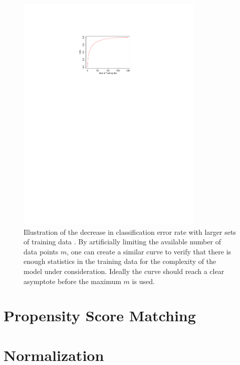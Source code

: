 \begin{figure}
  \centering
  \includegraphics[width=0.8\textwidth]{figures/ml/acc_vs_m}
\caption{
Illustration of the decrease in classification error rate
with larger sets of training data \cite{HastieTF09}.
By artificially limiting the available number of data points $m$,
one can create a similar curve to verify that
there is enough statistics in the training data
for the complexity of the model under consideration.
Ideally the curve should reach a clear asymptote before the maximum $m$ is used.
}
\label{fig:enough_training_data}
\end{figure}

\section{Propensity Score Matching}
\label{ml_general:propensity}

\section{Normalization}
\label{ml_general:normalization}

